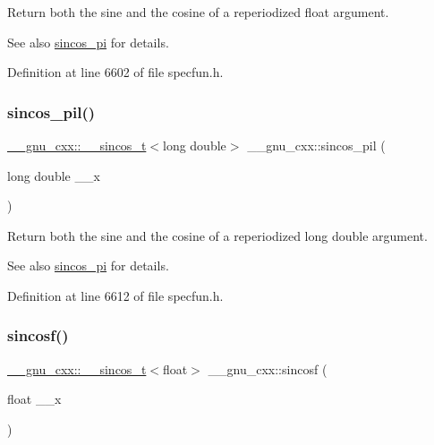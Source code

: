 Return both the sine and the cosine of a reperiodized {\ttfamily float} argument.

\begin{DoxySeeAlso}{See also}
\hyperlink{group__gnu__math__spec__func_ga6553883f127ea0de67041c3128e03813}{sincos\+\_\+pi} for details. 
\end{DoxySeeAlso}


Definition at line 6602 of file specfun.\+h.

\mbox{\label{group__gnu__math__spec__func_ga1f1efc07313a3de1e994d89c3b83b957}} 
\subsubsection{\texorpdfstring{sincos\+\_\+pil()}{sincos\_pil()}}
{\footnotesize\ttfamily \hyperlink{struct____gnu__cxx_1_1____sincos__t}{\+\_\+\+\_\+gnu\+\_\+cxx\+::\+\_\+\+\_\+sincos\+\_\+t}$<$long double$>$ \+\_\+\+\_\+gnu\+\_\+cxx\+::sincos\+\_\+pil (\begin{DoxyParamCaption}\item[{long double}]{\+\_\+\+\_\+x }\end{DoxyParamCaption})\hspace{0.3cm}{\ttfamily [inline]}}

Return both the sine and the cosine of a reperiodized {\ttfamily  long double } argument.

\begin{DoxySeeAlso}{See also}
\hyperlink{group__gnu__math__spec__func_ga6553883f127ea0de67041c3128e03813}{sincos\+\_\+pi} for details. 
\end{DoxySeeAlso}


Definition at line 6612 of file specfun.\+h.

\mbox{\label{group__gnu__math__spec__func_ga3929d13e38535418cd24db5cee80660c}} 
\subsubsection{\texorpdfstring{sincosf()}{sincosf()}}
{\footnotesize\ttfamily \hyperlink{struct____gnu__cxx_1_1____sincos__t}{\+\_\+\+\_\+gnu\+\_\+cxx\+::\+\_\+\+\_\+sincos\+\_\+t}$<$float$>$ \+\_\+\+\_\+gnu\+\_\+cxx\+::sincosf (\begin{DoxyParamCaption}\item[{float}]{\+\_\+\+\_\+x }\end{DoxyParamCaption})\hspace{0.3cm}{\ttfamily [inline]}}

